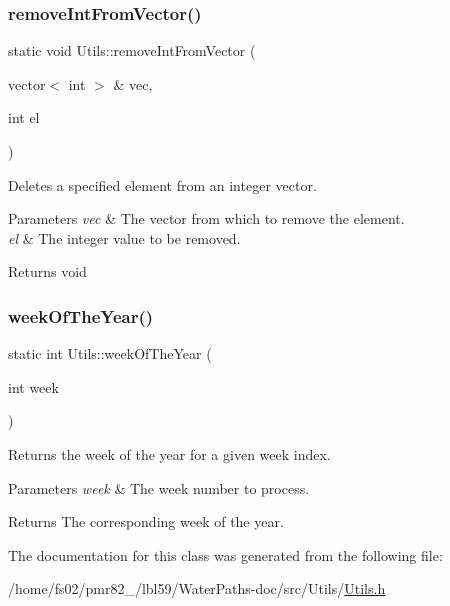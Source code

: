 \subsubsection{\texorpdfstring{remove\+Int\+From\+Vector()}{removeIntFromVector()}}
{\footnotesize\ttfamily static void Utils\+::remove\+Int\+From\+Vector (\begin{DoxyParamCaption}\item[{vector$<$ int $>$ \&}]{vec,  }\item[{int}]{el }\end{DoxyParamCaption})\hspace{0.3cm}{\ttfamily [static]}}



Deletes a specified element from an integer vector. 


\begin{DoxyParams}{Parameters}
{\em vec} & The vector from which to remove the element. \\
\hline
{\em el} & The integer value to be removed.\\
\hline
\end{DoxyParams}
\begin{DoxyReturn}{Returns}
void 
\end{DoxyReturn}
\mbox{\label{classUtils_a510a7b15687fc6bd6b1c1742d7d7e9fd}} 
\subsubsection{\texorpdfstring{week\+Of\+The\+Year()}{weekOfTheYear()}}
{\footnotesize\ttfamily static int Utils\+::week\+Of\+The\+Year (\begin{DoxyParamCaption}\item[{int}]{week }\end{DoxyParamCaption})\hspace{0.3cm}{\ttfamily [static]}}



Returns the week of the year for a given week index. 


\begin{DoxyParams}{Parameters}
{\em week} & The week number to process. \\
\hline
\end{DoxyParams}
\begin{DoxyReturn}{Returns}
The corresponding week of the year. 
\end{DoxyReturn}


The documentation for this class was generated from the following file\+:\begin{DoxyCompactItemize}
\item 
/home/fs02/pmr82\+\_/lbl59/\+Water\+Paths-\/doc/src/\+Utils/\mbox{\hyperlink{Utils_8h}{Utils.\+h}}\end{DoxyCompactItemize}
